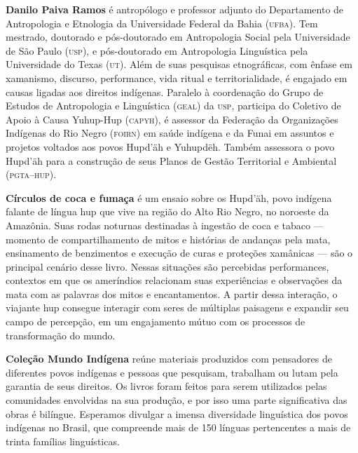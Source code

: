 \textbf{Danilo Paiva Ramos} é antropólogo e professor adjunto do Departamento de Antropologia e Etnologia da Universidade Federal da Bahia \textsc{(ufba)}. Tem mestrado, doutorado e pós-doutorado em Antropologia Social pela Universidade de São Paulo \textsc{(usp)}, e pós-doutorado em Antropologia Linguística pela Universidade do Texas \textsc{(ut)}. Além de suas pesquisas etnográficas, com ênfase em xamanismo, discurso, performance, vida ritual e territorialidade, é engajado em causas ligadas aos direitos indígenas. Paralelo à coordenação do Grupo de Estudos de Antropologia e Linguística (\textsc{geal}) da \textsc{usp}, participa do Coletivo de Apoio à Causa Yuhup-Hup (\textsc{capyh}), é assessor da Federação da Organizações Indígenas do Rio Negro (\textsc{foirn}) em saúde indígena e da Funai em assuntos e projetos voltados aos povos Hupd'äh e Yuhupdëh. Também assessora o povo Hupd'äh para a construção de seus Planos de Gestão Territorial e Ambiental (\textsc{pgta--hup}).

\textbf{Círculos de coca e fumaça} é um ensaio sobre os Hupd’äh, povo indígena falante de língua hup que vive na região do Alto Rio Negro, no noroeste da Amazônia. Suas rodas noturnas destinadas à ingestão de coca e tabaco --- momento de compartilhamento de mitos e histórias de andanças pela mata, ensinamento de benzimentos e execução de curas e proteções xamânicas --- são o principal cenário desse livro. Nessas situações são percebidas performances, contextos em que os ameríndios relacionam suas experiências e observações da mata com as palavras dos mitos e encantamentos. A partir dessa interação, o viajante hup consegue interagir com seres de múltiplas paisagens e expandir seu campo de percepção, em um engajamento mútuo com os processos de transformação do mundo.

\textbf{Coleção Mundo Indígena} reúne materiais produzidos com pensadores de diferentes povos indígenas e pessoas que pesquisam, trabalham ou lutam pela garantia de seus direitos. Os livros foram feitos para serem utilizados pelas comunidades envolvidas na sua produção, e por isso uma parte significativa das obras é bilíngue. Esperamos divulgar a imensa diversidade linguística dos povos indígenas no Brasil, que compreende mais de 150 línguas pertencentes a mais de trinta famílias linguísticas.

